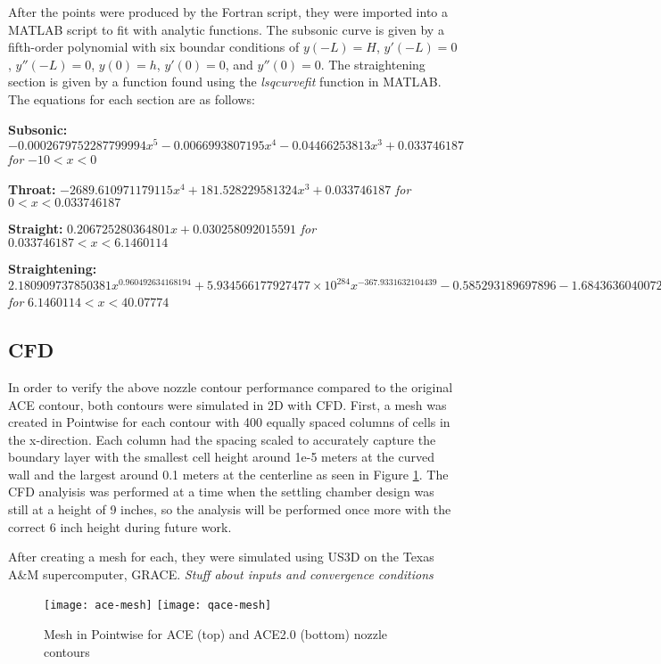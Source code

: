 After the points were produced by the Fortran script, they were imported into a MATLAB script to fit with analytic functions. The subsonic curve is given by a fifth-order polynomial with six boundar conditions of $y(-L)=H$, $y'(-L)=0$, $y''(-L)=0$, $y(0)=h$, $y'(0)=0$, and $y''(0)=0$. The straightening section is given by a function found using the \textit{lsqcurvefit} function in MATLAB. The equations for each section are as follows:

\textbf{Subsonic:} $-0.0002679752287799994x^5 - 0.0066993807195x^4 - 0.04466253813x^3 + 0.033746187$ \textit{for} $-10 < x < 0$

\textbf{Throat:} $-2689.610971179115x^4 + 181.528229581324x^3 + 0.033746187$ \textit{for} $0 < x < 0.033746187$

\textbf{Straight:} $0.206725280364801x + 0.030258092015591$ \textit{for} $0.033746187 < x < 6.1460114$

\textbf{Straightening:} $2.180909737850381x^{0.960492634168194} + 5.934566177927477 \times 10^{284} x^{-367.9331632104439} - 0.585293189697896 - 1.684363604007221x^{1.011336503949665} - 0.023814395465567 \ln(0.418646933043039x)$ \textit{for} $6.1460114 < x < 40.07774$

\subsection{CFD}

In order to verify the above nozzle contour performance compared to the original ACE contour, both contours were simulated in 2D with CFD. First, a mesh was created in Pointwise for each contour with 400 equally spaced columns of cells in the x-direction. Each column had the spacing scaled to accurately capture the boundary layer with the smallest cell height around 1e-5 meters at the curved wall and the largest around 0.1 meters at the centerline as seen in Figure \ref{fig:mesh}. The CFD analyisis was performed at a time when the settling chamber design was still at a height of 9 inches, so the analysis will be performed once more with the correct 6 inch height during future work.

After creating a mesh for each, they were simulated using US3D on the Texas A\&M supercomputer, GRACE. \textit{Stuff about inputs and convergence conditions}

\begin{figure}[ht]
    \centering
    \texttt{[image: ace-mesh]}
    \texttt{[image: qace-mesh]}
    \caption{Mesh in Pointwise for ACE (top) and ACE2.0 (bottom) nozzle contours}
    \label{fig:mesh}
\end{figure}

